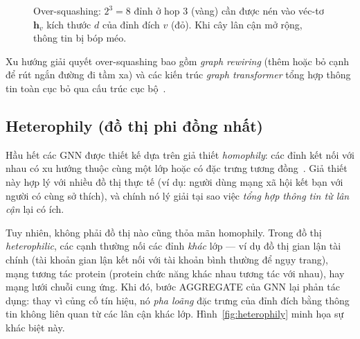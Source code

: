 \begin{figure}[htbp]
\centering
{}
\caption{Over-squashing: $2^3=8$ đỉnh ở hop 3 (vàng) cần được nén vào véc-tơ $\mathbf{h}_v$ kích thước $d$ của đỉnh đích $v$ (đỏ). Khi cây lân cận mở rộng, thông tin bị bóp méo.}
\label{fig:oversquashing}
\end{figure}

Xu hướng giải quyết over-squashing bao gồm \textit{graph rewiring} (thêm hoặc bỏ cạnh để rút ngắn đường đi tầm xa) và các kiến trúc \textit{graph transformer} tổng hợp thông tin toàn cục bỏ qua cấu trúc cục bộ~\cite{Alon2021Bottleneck}.

\subsection{Heterophily (đồ thị phi đồng nhất)}

Hầu hết các GNN được thiết kế dựa trên giả thiết \textit{homophily}: các đỉnh kết nối với nhau có xu hướng thuộc cùng một lớp hoặc có đặc trưng tương đồng~\cite{Zhu2020BeyondHomophily}. Giả thiết này hợp lý với nhiều đồ thị thực tế (ví dụ: người dùng mạng xã hội kết bạn với người có cùng sở thích), và chính nó lý giải tại sao việc \textit{tổng hợp thông tin từ lân cận} lại có ích.

Tuy nhiên, không phải đồ thị nào cũng thỏa mãn homophily. Trong đồ thị \textit{heterophilic}, các cạnh thường nối các đỉnh \textit{khác} lớp --- ví dụ đồ thị gian lận tài chính (tài khoản gian lận kết nối với tài khoản bình thường để ngụy trang), mạng tương tác protein (protein chức năng khác nhau tương tác với nhau), hay mạng lưới chuỗi cung ứng. Khi đó, bước AGGREGATE của GNN lại phản tác dụng: thay vì củng cố tín hiệu, nó \textit{pha loãng} đặc trưng của đỉnh đích bằng thông tin không liên quan từ các lân cận khác lớp. Hình~\ref{fig:heterophily} minh họa sự khác biệt này.

